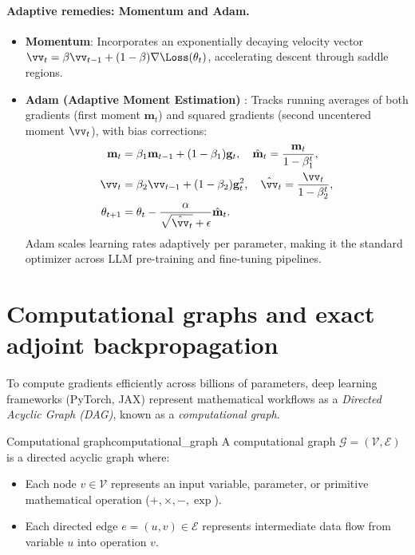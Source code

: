 \documentclass[../../main.tex]{subfiles}
\begin{document}
\paragraph{Adaptive remedies: Momentum and Adam.}
\begin{itemize}
    \item \textbf{Momentum}: Incorporates an exponentially decaying velocity vector $\vv_t = \beta \vv_{t-1} + (1 - \beta) \nabla \Loss(\theta_t)$, accelerating descent through saddle regions.
    \item \textbf{Adam (Adaptive Moment Estimation)} \cite{kingma2014adam}: Tracks running averages of both gradients (first moment $\mathbf{m}_t$) and squared gradients (second uncentered moment $\vv_t$), with bias corrections:
    \begin{align}
    \mathbf{m}_t &= \beta_1 \mathbf{m}_{t-1} + (1 - \beta_1) \mathbf{g}_t, \quad \hat{\mathbf{m}}_t = \frac{\mathbf{m}_t}{1 - \beta_1^t}, \\
    \vv_t &= \beta_2 \vv_{t-1} + (1 - \beta_2) \mathbf{g}_t^2, \quad \hat{\vv}_t = \frac{\vv_t}{1 - \beta_2^t}, \\
    \theta_{t+1} &= \theta_t - \frac{\alpha}{\sqrt{\hat{\vv}_t} + \epsilon} \hat{\mathbf{m}}_t.
    \end{align}
    Adam scales learning rates adaptively per parameter, making it the standard optimizer across LLM pre-training and fine-tuning pipelines.
\end{itemize}


\section{Computational graphs and exact adjoint backpropagation}
\label{sec:backprop_computational_graph}

To compute gradients efficiently across billions of parameters, deep learning frameworks (PyTorch, JAX) represent mathematical workflows as a \emph{Directed Acyclic Graph (DAG)}, known as a \emph{computational graph}.

\begin{definition}{Computational graph}{computational_graph}
A computational graph $\mathcal{G} = (\mathcal{V}, \mathcal{E})$ is a directed acyclic graph where:
\begin{itemize}
    \item Each node $v \in \mathcal{V}$ represents an input variable, parameter, or primitive mathematical operation ($+, \times, -, \exp$).
    \item Each directed edge $e = (u, v) \in \mathcal{E}$ represents intermediate data flow from variable $u$ into operation $v$.
\end{itemize}
\end{definition}
\end{document}
